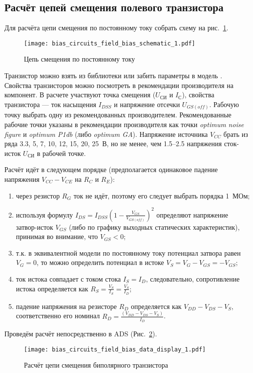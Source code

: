\subsection{Расчёт цепей смещения полевого транзистора}

Для расчёта цепи смещения по постоянному току собрать схему на рис.~\ref{fig:bias_circuits_field_bias_schematic_1}.
\begin{figure}[!ht]
    \centering
    \texttt{[image: bias\_circuits\_field\_bias\_schematic\_1.pdf]}
    \caption{Цепь смещения по постоянному току}%
    \label{fig:bias_circuits_field_bias_schematic_1}
\end{figure}

Транзистор можно взять из библиотеки  или забить параметры в модель .
Свойства транзисторов можно посмотреть в рекомендации производителя на компонент.
В расчете участвуют точка смещения ($U_\text{СИ}$ и $I_\text{С}$), свойства транзистора --- ток насыщения $I_{DSS}$ и напряжение отсечки $U_{GS(off)}$.
Рабочую точку выбрать одну из рекомендованных производителем.
Рекомендованные рабочие точки указаны в рекомендации производителя как точки \emph{optimum noise figure} и \emph{optimum P1db} (либо \emph{optimum GA}).
Напряжение источника $V_{CC}$ брать из ряда 3.3, 5, 7, 10, 12, 15, 20, 25~В, но не менее, чем 1.5--2.5 напряжения сток-исток $U_\text{СИ}$ в рабочей точке.

Расчёт идёт в следующем порядке (предполагается одинаковое падение напряжения $V_{CC} - V_{CE}$ на $R_C$ и $R_E$):
\begin{enumerate}
    \item через резистор $R_G$ ток не идёт, поэтому его следует выбрать порядка 1~МОм;
    \item используя формулу $I_{DS} = I_{DSS} \left(1 - \frac{V_{GS}}{V_{GS(off)}}\right)^2$ определяют напряжение затвор-исток $V_{GS}$ (либо по графику выходных статических характеристик), принимая во внимание, что $V_{GS} < 0$;
    \item т.к. в эквивалентной модели по постоянному току потенциал затвора равен $V_G = 0$, то можно определить потенциал в истоке $V_S = V_G - V_{GS} = -V_{GS}$;
    \item ток истока совпадает с током стока $I_S = I_D$, следовательно, сопротивление истока определяется как $R_S = \frac{V_S}{I_S} = \frac{V_S}{I_D}$;
    \item падение напряжения на резисторе $R_D$ определяется как $V_{DD} - V_{DS} - V_{S}$, соответственно его номинал $R_D = \frac{(V_{DD} - V_{DS} - V_S)}{I_D}$.
\end{enumerate}

Проведём расчёт непосредственно в ADS (Рис.~\ref{fig:bias_circuits_field_bias_data_display_1}).
\begin{figure}[!ht]
    \centering
    \texttt{[image: bias\_circuits\_field\_bias\_data\_display\_1.pdf]}
    \caption{Расчёт цепи смещения биполярного транзистора}%
    \label{fig:bias_circuits_field_bias_data_display_1}
\end{figure}


